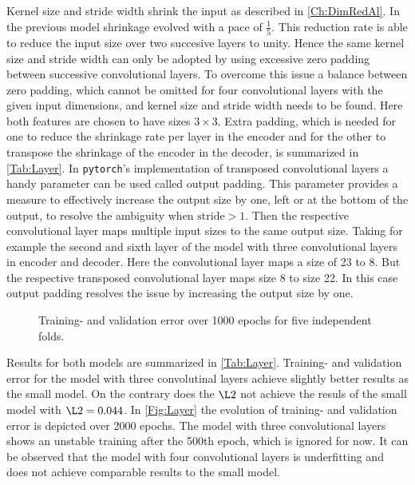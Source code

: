 Kernel size and stride width shrink the input as described in \cref{Ch:DimRedAl}. In the previous model shrinkage evolved with a pace of \(\frac{1}{5}\). This reduction rate is able to reduce the input size over two succesive layers to unity. Hence the same kernel size and stride width can only be adopted by using excessive zero padding between successive convolutional layers. To overcome this issue a balance between zero padding, which cannot be omitted for four convolutional layers with the given input dimensions, and kernel size and stride width needs to be found. Here both features are chosen to have sizes \(3\times 3\). Extra padding, which is needed for one to reduce the shrinkage rate per layer in the encoder and for the other to transpose the shrinkage of the encoder in the decoder, is summarized in \cref{Tab:Layer}. In \texttt{pytorch}'s implementation of transposed convolutional layers a handy parameter can be used called output padding. This parameter provides a measure to effectively increase the output size by one, left or at the bottom of the output, to resolve the ambiguity when \(\text{stride}>1\). Then the respective convolutional layer maps multiple input sizes to the same output size. Taking for example the second and sixth layer of the model with three convolutional layers in encoder and decoder. Here the convolutional layer maps a size of 23 to 8. But the respective transposed convolutional layer maps size 8 to size 22. In this case output padding resolves the issue by increasing the output size by one.         
\begin{center}
	\begin{figure}[htbp!]
		
		\label{Fig:kFold}
		\caption{Training- and validation error over 1000 epochs for five independent folds.}
	\end{figure}
\end{center}
Results for both models are summarized in \cref{Tab:Layer}. Training- and validation error for the model with three convolutinal layers achieve slightly better results as the small model. On the contrary does the \(\L2\) not achieve the resuls of the small model with \(\L2=0.044\). In \cref{Fig:Layer} the evolution of training- and validation error is depicted over 2000 epochs. The model with three convolutional layers shows an unstable training after the 500th epoch, which is ignored for now. It can be observed that the model with four convolutional layers is underfitting and does not achieve comparable results to the small model. 
